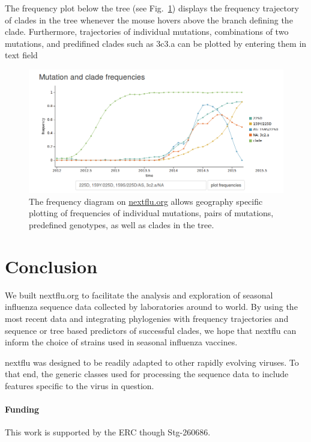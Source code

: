 \documentclass{bioinfo}
\newcommand{\FIG}[1]{Fig.~\ref{fig:#1}}
\begin{document}
The frequency plot below the tree (see \FIG{freq}) displays the frequency trajectory
of clades in the tree whenever the mouse hovers above the branch defining the clade. 
Furthermore, trajectories of individual mutations, combinations of two mutations, and 
predifined clades such as 3c3.a can be plotted by entering them in text field
\begin{figure}[bhtp]
	\begin{center}
	\includegraphics[width=0.99\columnwidth]{figures/frequencies}
\caption[]{The frequency diagram on \url{nextflu.org} allows geography specific
		plotting of frequencies of individual mutations, pairs of mutations, 
		predefined genotypes, as well as clades in the tree. }
\label{fig:freq}
\end{center}
\end{figure}


\section{Conclusion}
We built nextflu.org to facilitate the analysis and exploration of seasonal influenza
sequence data collected by laboratories around to world. By using the most recent data
and integrating phylogenies with frequency trajectories and sequence or tree based
predictors of successful clades, we hope that nextflu can inform the choice of  
strains used in seasonal influenza vaccines. 

nextflu was designed to be readily adapted to other rapidly evolving viruses. 
To that end, the generic classes used for processing the sequence data to include features 
specific to the virus in question. 


\paragraph{Funding\textcolon}This work is supported by the ERC though
Stg-260686.



\end{document}
